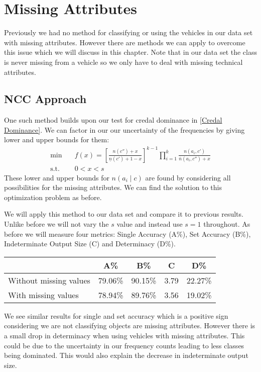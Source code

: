 \chapter{Missing Attributes}

Previously we had no method for classifying or using the vehicles in our data set with missing attributes.
However there are methods we can apply to overcome this issue which we will discuss in this chapter.
Note that in our data set the class is never missing from a vehicle so we only have to deal with missing technical attributes.

\section{NCC Approach}

One such method builds upon our test for credal dominance in \cref{Credal Dominance}.
We can factor in our our uncertainty of the frequencies by giving lower and upper bounds for them:
\begin{align}
	\min \quad & f(x) = \left[ \frac{n(c'') + x}{\underline{n}(c') + 1 - x} \right]^{k-1} \prod_{i=1}^k \frac{n(a_i, c')}{\overline{n}(a_i, c'') + x} \\
	\text{s.t.} \quad & 0 < x < s
\end{align}
These lower and upper bounds for $n(a_i \mid c)$ are found by considering all possibilities for the missing attributes.
We can find the solution to this optimization problem as before.

We will apply this method to our data set and compare it to previous results.
Unlike before we will not vary the $s$ value and instead use $s=1$ throughout.
As before we will measure four metrics: Single Accuracy (A\%), Set Accuracy (B\%), Indeterminate Output Size (C) and Determinacy (D\%).

\begin{center}
\begin{tabular}{l|c c c c}
                       & A\%     & B\%     & C    & D\%     \\
\hline
Without missing values & 79.06\% & 90.15\% & 3.79 & 22.27\% \\
With missing values    & 78.94\% & 89.76\% & 3.56 & 19.02\% \\
\end{tabular}
\end{center}

We see similar results for single and set accuracy which is a positive sign considering we are not classifying objects are missing attributes.
However there is a small drop in determinacy when using vehicles with missing attributes.
This could be due to the uncertainty in our frequency counts leading to less classes being dominated.
This would also explain the decrease in indeterminate output size.